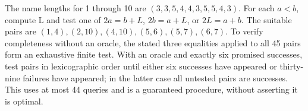 The name lengths for 1 through 10 are $(3,3,5,4,4,3,5,5,4,3)$. For each $a<b$, compute L and test one of $2a=b+L$, $2b=a+L$, or $2L=a+b$. The suitable pairs are $\boxed{(1,4),(2,10),(4,10),(5,6),(5,7),(6,7)}$. To verify completeness without an oracle, the stated three equalities applied to all 45 pairs form an exhaustive finite test. With an oracle and exactly six promised successes, test pairs in lexicographic order until either six successes have appeared or thirty-nine failures have appeared; in the latter case all untested pairs are successes. This uses at most 44 queries and is a guaranteed procedure, without asserting it is optimal.
